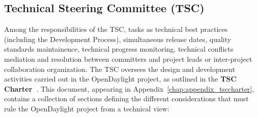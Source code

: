 \documentclass[a4paper, 12pt]{book}
\begin{document}
\subsection{Technical Steering Committee (TSC)}
Among the responsibilities of the TSC, tasks as technical best practices (including the Development Process), simultaneous release dates, quality standards maintainence, technical progress monitoring, technical conflicts mediation and resolution between committers and project leads or inter-project collaboration organization. The TSC oversees the design and development activities carried out in the OpenDaylight project, as outlined in the \textbf{TSC Charter~\cite{OpenDaylightTSCCharter}}. This document, appearing in Appendix~\ref{chap:appendix_tsccharter}, contains a collection of sections defining the different considerations that must rule the OpenDaylight project from a technical view:
\end{document}
